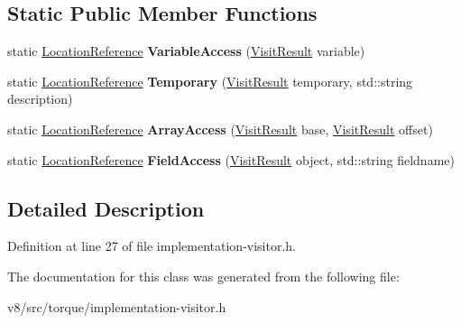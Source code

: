 \subsection*{Static Public Member Functions}
\begin{DoxyCompactItemize}
\item 
\mbox{\label{classv8_1_1internal_1_1torque_1_1LocationReference_ac04b94451975b8e80801dd09716e568d}} 
static \mbox{\hyperlink{classv8_1_1internal_1_1torque_1_1LocationReference}{Location\+Reference}} {\bfseries Variable\+Access} (\mbox{\hyperlink{classv8_1_1internal_1_1torque_1_1VisitResult}{Visit\+Result}} variable)
\item 
\mbox{\label{classv8_1_1internal_1_1torque_1_1LocationReference_a6fbe47dad10e43255fc361798cae90a6}} 
static \mbox{\hyperlink{classv8_1_1internal_1_1torque_1_1LocationReference}{Location\+Reference}} {\bfseries Temporary} (\mbox{\hyperlink{classv8_1_1internal_1_1torque_1_1VisitResult}{Visit\+Result}} temporary, std\+::string description)
\item 
\mbox{\label{classv8_1_1internal_1_1torque_1_1LocationReference_aae89656eb7b5aed9343e8e36760c7dd2}} 
static \mbox{\hyperlink{classv8_1_1internal_1_1torque_1_1LocationReference}{Location\+Reference}} {\bfseries Array\+Access} (\mbox{\hyperlink{classv8_1_1internal_1_1torque_1_1VisitResult}{Visit\+Result}} base, \mbox{\hyperlink{classv8_1_1internal_1_1torque_1_1VisitResult}{Visit\+Result}} offset)
\item 
\mbox{\label{classv8_1_1internal_1_1torque_1_1LocationReference_a0fe2ef62690f4b18b25e28b03f19a074}} 
static \mbox{\hyperlink{classv8_1_1internal_1_1torque_1_1LocationReference}{Location\+Reference}} {\bfseries Field\+Access} (\mbox{\hyperlink{classv8_1_1internal_1_1torque_1_1VisitResult}{Visit\+Result}} object, std\+::string fieldname)
\end{DoxyCompactItemize}


\subsection{Detailed Description}


Definition at line 27 of file implementation-\/visitor.\+h.



The documentation for this class was generated from the following file\+:\begin{DoxyCompactItemize}
\item 
v8/src/torque/implementation-\/visitor.\+h\end{DoxyCompactItemize}
